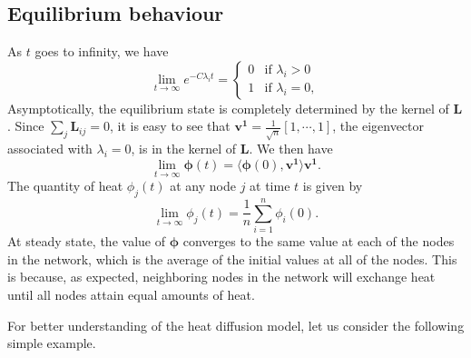 \documentclass[10pt,a4paper]{article}
\begin{document}
    	 \subsection{ Equilibrium behaviour }
    	 As $t$ goes to infinity, we have 
    	 \begin{equation}
    	 \lim_{t \to \infty} e^{-C\lambda_i t} = \begin{cases} 0 &\mbox{if } \lambda_i > 0 \\
    	 1 & \mbox{if } \lambda_i = 0, \end{cases} 
    	 \end{equation}
    	 Asymptotically, the equilibrium state is completely determined by the kernel of $\mathbf{L}$. Since $\sum_{j} \mathbf{L}_{ij}=0$, it is easy to see that $\mathbf{v^1}= \frac{1}{\sqrt{n}}[1,\cdots,1]$, the eigenvector associated with $\lambda_i =0$, is in the kernel of $\mathbf{L}$. We then have
    	 \begin{equation}
    	 \lim_{t \to \infty}\boldsymbol{\phi}(t) = \langle \boldsymbol{\phi}(0), \mathbf{v^1} \rangle \mathbf{v^1}.
    	 \end{equation}
    	 The quantity of heat $\phi_j(t)$ at any node $j$ at time $t$ is given by
    	 \begin{equation}
    	 \lim_{t \to \infty}\phi_j(t) = \frac{1}{n} \sum_{i = 1}^n \phi_i(0). 
    	 \end{equation}
    	 At steady state, the value of $\boldsymbol{\phi}$ converges to the same value at each of the nodes in the network, which is the average of the initial values at all of the nodes. This is because, as expected, neighboring nodes in the network will exchange heat until all nodes attain equal amounts of heat.
    	 
    	 For better understanding of the heat diffusion model, let us consider the following simple example.
    	 
\end{document}
